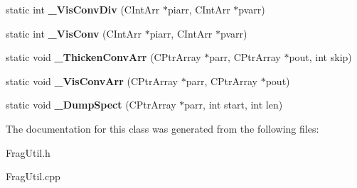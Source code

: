 \begin{DoxyCompactItemize}
\item 
\hypertarget{class_c_frag_util_a7143b54fe31f1b658f4a1f9f9f77a387}{static int {\bfseries \-\_\-\-Vis\-Conv\-Div} (C\-Int\-Arr $\ast$piarr, C\-Int\-Arr $\ast$pvarr)}\label{class_c_frag_util_a7143b54fe31f1b658f4a1f9f9f77a387}

\item 
\hypertarget{class_c_frag_util_a483ba9c9fe4804da2c6332aeb866cd2d}{static int {\bfseries \-\_\-\-Vis\-Conv} (C\-Int\-Arr $\ast$piarr, C\-Int\-Arr $\ast$pvarr)}\label{class_c_frag_util_a483ba9c9fe4804da2c6332aeb866cd2d}

\item 
\hypertarget{class_c_frag_util_a08e0e3daf905675ba2fb04120b082e95}{static void {\bfseries \-\_\-\-Thicken\-Conv\-Arr} (C\-Ptr\-Array $\ast$parr, C\-Ptr\-Array $\ast$pout, int skip)}\label{class_c_frag_util_a08e0e3daf905675ba2fb04120b082e95}

\item 
\hypertarget{class_c_frag_util_a0d0e16c22a81f8420e6b31241167930d}{static void {\bfseries \-\_\-\-Vis\-Conv\-Arr} (C\-Ptr\-Array $\ast$parr, C\-Ptr\-Array $\ast$pout)}\label{class_c_frag_util_a0d0e16c22a81f8420e6b31241167930d}

\item 
\hypertarget{class_c_frag_util_a6062463a5a17d9b6198bb22690d727e6}{static void {\bfseries \-\_\-\-Dump\-Spect} (C\-Ptr\-Array $\ast$parr, int start, int len)}\label{class_c_frag_util_a6062463a5a17d9b6198bb22690d727e6}

\end{DoxyCompactItemize}


The documentation for this class was generated from the following files\-:\begin{DoxyCompactItemize}
\item 
Frag\-Util.\-h\item 
Frag\-Util.\-cpp\end{DoxyCompactItemize}
